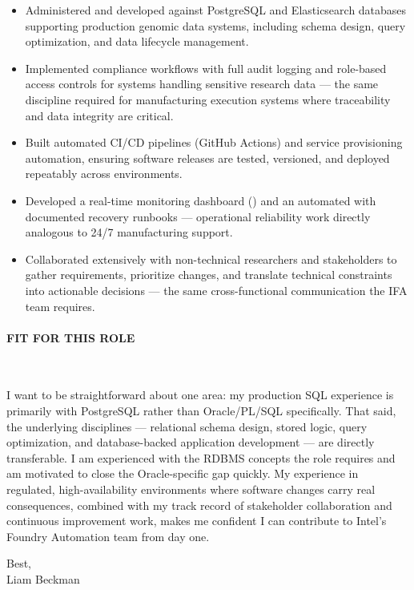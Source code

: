 \begin{itemize}

\item Administered and developed against PostgreSQL and Elasticsearch databases supporting production genomic data systems, including schema design, query optimization, and data lifecycle management.

\item Implemented compliance workflows with full audit logging and role-based access controls for systems handling sensitive research data --- the same discipline required for manufacturing execution systems where traceability and data integrity are critical.

\item Built automated CI/CD pipelines (GitHub Actions) and service provisioning automation, ensuring software releases are tested, versioned, and deployed repeatably across environments.

\item Developed a real-time monitoring dashboard () and an automated  with documented recovery runbooks --- operational reliability work directly analogous to 24/7 manufacturing support.

\item Collaborated extensively with non-technical researchers and stakeholders to gather requirements, prioritize changes, and translate technical constraints into actionable decisions --- the same cross-functional communication the IFA team requires.

\end{itemize}

\paragraph{FIT FOR THIS ROLE}\

\vspace*{\baselineskip}

I want to be straightforward about one area: my production SQL experience is primarily with PostgreSQL rather than Oracle/PL/SQL specifically. That said, the underlying disciplines --- relational schema design, stored logic, query optimization, and database-backed application development --- are directly transferable. I am experienced with the RDBMS concepts the role requires and am motivated to close the Oracle-specific gap quickly. My experience in regulated, high-availability environments where software changes carry real consequences, combined with my track record of stakeholder collaboration and continuous improvement work, makes me confident I can contribute to Intel's Foundry Automation team from day one.

\vspace*{\baselineskip}

Best,\\

Liam Beckman

\vfill \myBreak{}



